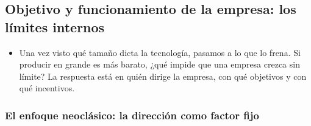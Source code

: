 \documentclass[11pt]{article}
\begin{document}
\subsection{Objetivo y funcionamiento de la empresa: los límites internos}\label{sec:limites-internos}

\begin{itemize}
\item Una vez visto qué tamaño dicta la tecnología, pasamos a lo que lo frena. Si producir en grande es más barato, ¿qué impide que una empresa crezca sin límite? La respuesta está en quién dirige la empresa, con qué objetivos y con qué incentivos.
\end{itemize}

\subsubsection{El enfoque neoclásico: la dirección como factor fijo}\label{sec:direccion}
\end{document}
